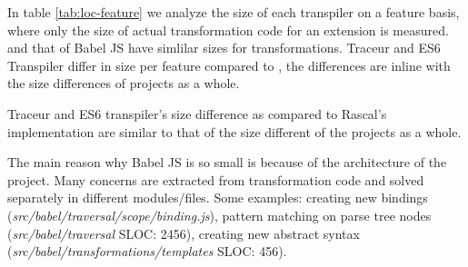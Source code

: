 In table \ref{tab:loc-feature} we analyze the size of each transpiler on a feature basis, where only the size of actual transformation code for an extension is measured. \projectname and that of Babel JS have simlilar sizes for transformations. Traceur and ES6 Transpiler differ in size per feature compared to \projectname, the differences are inline with the size differences of projects as a whole.

Traceur and ES6 transpiler's size difference as compared to Rascal's implementation are similar to that of the size different of the projects as a whole.

The main reason why Babel JS is so small is because of the architecture of the project. Many concerns are extracted from transformation code and solved separately in different modules/files. Some examples: creating new bindings (\textit{src/babel/traversal/scope/binding.js}), pattern matching on parse tree nodes (\textit{src/babel/traversal} SLOC: 2456), creating new abstract syntax (\textit{src/babel/transformations/templates} SLOC: 456).


